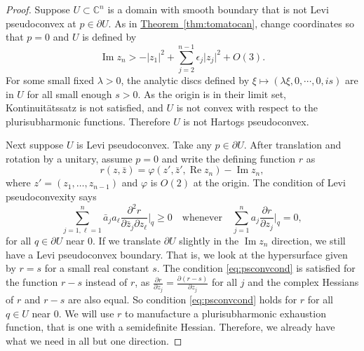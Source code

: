 \documentclass[12pt,openany]{book}
\renewcommand{\Re}{\operatorname{Re}}
\renewcommand{\Im}{\operatorname{Im}}
\newcommand{\sabs}[1]{\lvert {#1} \rvert}
\newcommand{\C}{{\mathbb{C}}}
\theoremstyle{plain}
\theoremstyle{remark}
\theoremstyle{definition}
\theoremstyle{exercise}
\theoremstyle{example}
\newcommand{\thmref}[1]{\hyperref[#1]{Theorem~\ref*{#1}}}
\begin{document}
\begin{proof}
Suppose
$U \subset \C^n$ is a domain with smooth boundary that is not
Levi pseudoconvex at $p \in \partial U$.
As in
\thmref{thm:tomatocan}, change coordinates so that $p=0$ and $U$ is defined
by
\begin{equation*}
\Im z_n > - \sabs{z_1}^2 + \sum_{j=2}^{n-1} \epsilon_j \sabs{z_j}^2 + O(3) .
\end{equation*}
For some small fixed $\lambda > 0$, the
analytic discs defined by $\xi \mapsto (\lambda \xi, 0, \cdots, 0, is)$
are in $U$ for all small enough $s > 0$.  As the origin
is in their limit set,
Kontinuit\"atssatz is not satisfied, and $U$ is not 
convex with respect to the plurisubharmonic functions.  Therefore 
$U$ is not Hartogs pseudoconvex.

Next suppose $U$ is Levi pseudoconvex.  Take any $p \in \partial U$.
After translation and rotation by a unitary, assume $p=0$ and
write the defining function $r$ as
\begin{equation*}
r(z,\bar{z}) = \varphi(z',\bar{z}',\Re z_n) - \Im z_n ,
\end{equation*}
where $z' = (z_1,\ldots,z_{n-1})$ and
$\varphi$ is $O(2)$ at the origin.
The condition of Levi pseudoconvexity says 
\begin{equation} \label{eq:psconvcond}
\sum_{j=1,\ell=1}^n
\bar{a}_j a_\ell \frac{\partial^2 r}{\partial \bar{z}_j \partial z_\ell} \Big|_q \geq 0 
\quad \text{whenever} \quad
\sum_{j=1}^n
a_j \frac{\partial r}{\partial z_j} \Big|_q = 0 ,
\end{equation}
for all $q \in \partial U$ near $0$.
If we translate $\partial U$ slightly in the $\Im z_n$ direction, we still
have a Levi pseudoconvex boundary.  That is, we
look at the hypersurface given by $r=s$ for a small real constant $s$.
The condition \eqref{eq:psconvcond} is 
satisfied for the function $r-s$ instead of $r$,
as $\frac{\partial r}{\partial z_j} =
\frac{\partial (r-s)}{\partial z_j}$ for all $j$ and the
complex Hessians of $r$ and $r-s$ are also equal.
So condition \eqref{eq:psconvcond} holds for $r$ for all $q \in U$ near $0$.
We will use $r$ to manufacture a plurisubharmonic exhaustion function, that
is one with a semidefinite Hessian.  Therefore, we already
have what we need in all but one direction.


\end{proof}
\end{document}

